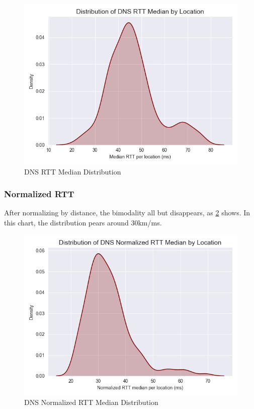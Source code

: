 \begin{figure}[h]
    \centering
    \includegraphics{images/dns/dist_raw_data/dns_rtt_median_distribution.png}
    \caption{DNS RTT Median Distribution}
    \label{fig:dns_analytics_median_dist}
\end{figure}

\subsubsection{Normalized RTT}

After normalizing by distance, the bimodality all but disappears, as \cref{fig:dns_analytics_norm_median_dist} shows. In this chart, the distribution pears around 30km/ms.

\begin{figure}[h]
    \centering
    \includegraphics{images/dns/dist_raw_data/dns_norm_rtt_median_distribution.png}
    \caption{DNS Normalized RTT Median Distribution}
    \label{fig:dns_analytics_norm_median_dist}
\end{figure}

